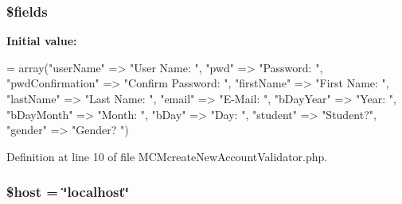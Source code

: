 \hypertarget{_m_c_mcreate_new_account_validator_8php_ab2303c817e3b402b77b7f99627b9c319}{
\subsubsection[{\$fields}]{\setlength{\rightskip}{0pt plus 5cm}\$fields}}\label{_m_c_mcreate_new_account_validator_8php_ab2303c817e3b402b77b7f99627b9c319}
{\bfseries Initial value\-:}
\begin{DoxyCode}
= array(\textcolor{stringliteral}{"userName"} => \textcolor{stringliteral}{"User Name: "},
                        \textcolor{stringliteral}{"pwd"} => \textcolor{stringliteral}{"Password: "},
                        \textcolor{stringliteral}{"pwdConfirmation"} => \textcolor{stringliteral}{"Confirm Password: "},
                        \textcolor{stringliteral}{"firstName"} => \textcolor{stringliteral}{"First Name: "},
                        \textcolor{stringliteral}{"lastName"} => \textcolor{stringliteral}{"Last Name: "},
                        \textcolor{stringliteral}{"email"} => \textcolor{stringliteral}{"E-Mail: "},
                        \textcolor{stringliteral}{"bDayYear"} => \textcolor{stringliteral}{"Year: "},
                        \textcolor{stringliteral}{"bDayMonth"} => \textcolor{stringliteral}{"Month: "},
                        \textcolor{stringliteral}{"bDay"} => \textcolor{stringliteral}{"Day: "},
                        \textcolor{stringliteral}{"student"} => \textcolor{stringliteral}{"Student?"},
                        \textcolor{stringliteral}{"gender"} => \textcolor{stringliteral}{"Gender? "})
\end{DoxyCode}


Definition at line 10 of file M\-C\-Mcreate\-New\-Account\-Validator.\-php.

\hypertarget{_m_c_mcreate_new_account_validator_8php_a711797613cb863ca0756df789c396bf2}{
\subsubsection[{\$host}]{\setlength{\rightskip}{0pt plus 5cm}\$host = \char`\"{}localhost\char`\"{}}}\label{_m_c_mcreate_new_account_validator_8php_a711797613cb863ca0756df789c396bf2}


